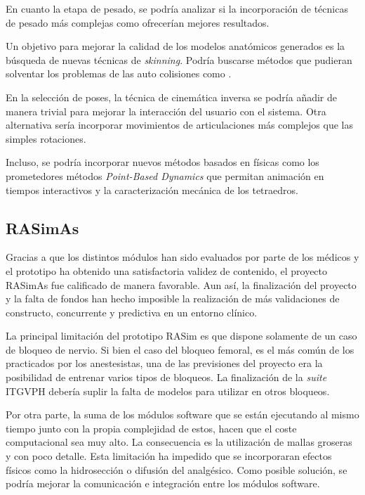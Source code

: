 En cuanto la etapa de pesado, se podría analizar si la incorporación de técnicas de pesado más complejas como
\cite{Jacobson:2011} ofrecerían mejores resultados.

Un objetivo para mejorar la calidad de los modelos anatómicos generados es la búsqueda de nuevas técnicas de \emph{skinning}. Podría buscarse métodos que pudieran solventar los problemas de las auto colisiones como \cite{Vaillant:2014}.

En la selección de poses, la técnica de cinemática inversa \cite{Shi:2007} se podría añadir de manera trivial para mejorar la interacción del usuario con el sistema. Otra alternativa sería incorporar movimientos de articulaciones más complejos \cite{joints} que las simples rotaciones.

Incluso, se podría incorporar nuevos métodos basados en físicas como los prometedores métodos \emph{Point-Based Dynamics}  \cite{abu2015position} que permitan animación en tiempos interactivos y la caracterización mecánica de los tetraedros.




\subsection{RASimAs}

Gracias a que los distintos módulos han sido evaluados por parte de los médicos y el prototipo ha obtenido una satisfactoria validez de contenido, el proyecto \ac{RASimAs} fue calificado de manera favorable. Aun así, la finalización del proyecto y la falta de fondos han hecho imposible la realización de más validaciones de constructo, concurrente y predictiva en un entorno clínico.    %

La principal limitación del prototipo \ac{RASim} es que dispone solamente de un caso de bloqueo de nervio. Si bien el caso del bloqueo femoral, es el más común de los practicados por los anestesistas, una de las previsiones del proyecto era la posibilidad de entrenar varios tipos de bloqueos. La finalización  de la \emph{suite} \ac{ITGVPH} debería suplir la falta de modelos para utilizar en otros bloqueos.

Por otra parte, la suma de los módulos software que se están ejecutando al mismo tiempo junto con la propia complejidad de estos, hacen que el coste computacional sea muy alto. La consecuencia es la utilización de mallas groseras y con poco detalle. Esta limitación ha impedido que se incorporaran efectos físicos como la hidrosección o difusión del analgésico. Como posible solución, se podría mejorar la comunicación e integración entre los módulos software.

